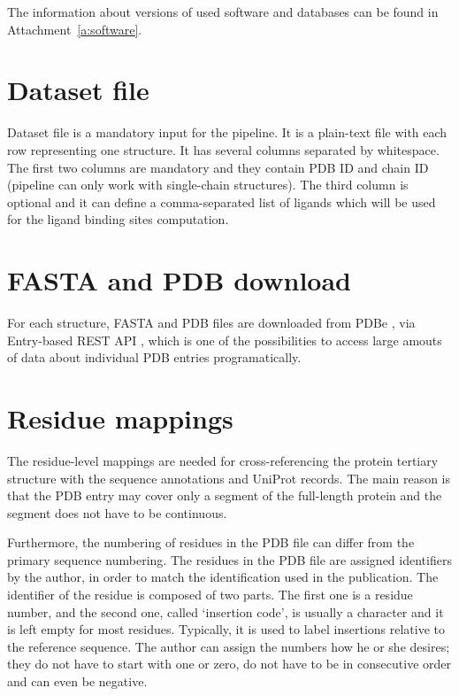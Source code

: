 The information about versions of used software and databases can be found in Attachment~\ref{a:software}.


\section{Dataset file}
Dataset file is a mandatory input for the pipeline. It is a plain-text file with each row representing one structure. It has several columns separated by whitespace. The first two columns are mandatory and they contain PDB ID and chain ID (pipeline can only work with single-chain structures). The third column is optional and it can define a comma-separated list of ligands which will be used for the ligand binding sites computation.

\section{FASTA and PDB download}

For each structure, FASTA and PDB files are downloaded from PDBe \cite{pdbe}, via Entry-based REST API \cite{pdbe_restapi}, which is one of the possibilities to access large amouts of data about individual PDB entries programatically.

\section{Residue mappings} \label{s:mappings}

The residue-level mappings are needed for cross-referencing the protein tertiary structure with the sequence annotations and UniProt \cite{uniprot} records. The main reason is that the PDB entry may cover only a segment of the full-length protein and the segment does not have to be continuous.

Furthermore, the numbering of residues in the PDB file can differ from the primary sequence numbering. The residues in the PDB file are assigned identifiers by the author, in order to match the identification used in the publication. The identifier of the residue is composed of two parts. The first one is a residue number, and the second one, called `insertion code', is usually a character and it is left empty for most residues. Typically, it is used to label insertions relative to the reference sequence. The author can assign the numbers how he or she desires; they do not have to start with one or zero, do not have to be in consecutive order and can even be negative.

